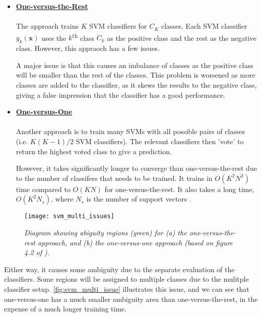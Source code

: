 \begin{itemize}
  \item \textbf{\underline{One-versus-the-Rest}} \\ \\
    The approach trains $K$ SVM classifiers for $C_K$ classes. Each SVM classifier $y_k(\mathbf{x})$ uses the $k$\textsuperscript{th} class $C_k$ as the positive class and the rest as the negative class. However, this appraoch has a few issues. 

A major issue is that this causes an imbalance of classes as the positive class will be smaller than the rest of the classes. This problem is worsened as more classes are added to the classifier, as it skews the results to the negative class, giving a false impression that the classifier has a good performance.
\\

  \item \textbf{\underline{One-versus-One}} \\ \\
Another approach is to train many SVMs with all possible pairs of classes (i.e. $K(K-1)/2$ SVM classifiers). The relevant classifiers then 'vote' to return the highest voted class to give a prediction.

However, it takes significantly longer to converge than one-versus-the-rest due to the number of classifers that needs to be trained. It trains in $O(K^2N^2)$ time compared to $O(KN)$ for one-versus-the-rest. It also takes a long time, $O(K^2N_{s})$, where $N_s$ is the number of support vectors \cite{mur-book}. 

\end{itemize}

\begin{figure}[H]
  \centering
  \texttt{[image: svm\_multi\_issues]}
  \caption{\textit{Diagram showing abiguity regions (green) for (a) the one-versus-the-rest approach, and (b) the one-versus-one approach (based on figure 4.2 of \protect{}).}}
  \label{fig:svm_multi_issues}
\end{figure}

Either way, it causes some ambiguity due to the separate evaluation of the classifiers. Some regions will be assigned to multiple classes due to the mulitple classifier setup. \autoref{fig:svm_multi_issue} illustrates this issue, and we can see that one-versus-one has a much smaller ambiguity area than one-versus-the-rest, in the expense of a much longer training time.


